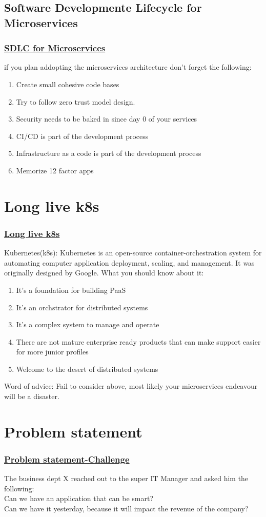 \documentclass{beamer}
\begin{document}
	\subsection{Software Developmente Lifecycle for Microservices}
\begin{frame}
	\frametitle{\underline{SDLC for Microservices}}
if you plan addopting the microservices architecture don't forget the following:
	\begin{enumerate}
		\item Create small cohesive code bases
		\item Try to follow zero trust model design.
		\item Security needs to be baked in since day 0 of your services
		\item CI/CD is part of the development process
		\item Infrastructure as a code is part of the development process
		\item Memorize 12 factor apps
	\end{enumerate}
\end{frame}

\section{Long live k8s}
\begin{frame}
	\frametitle{\underline{Long live k8s}}
	Kubernetes(k8s):	Kubernetes is an open-source container-orchestration system for automating computer application deployment, scaling, and management. It was originally designed by Google. What you should know about it:
	\begin{enumerate}
		\item It's a foundation for building PaaS
		\item It's an orchstrator for distributed systems
		\item It's a complex system to manage and operate
		\item There are not mature enterprise ready products that can make support easier for more junior profiles
		\item Welcome to the desert of distributed systems
	\end{enumerate}
	Word of advice: Fail to consider above, most likely your microservices endeavour will be a disaster.
\end{frame}

\section{Problem statement}
\begin{frame}
	\frametitle{\underline{Problem statement-Challenge}}
	The business dept X reached out to the super IT Manager and asked him the following:
	 \\Can we have an application that can be smart?
	 \\Can we have it yesterday, because it  will impact the revenue of the company?
\end{frame}
\end{document}
